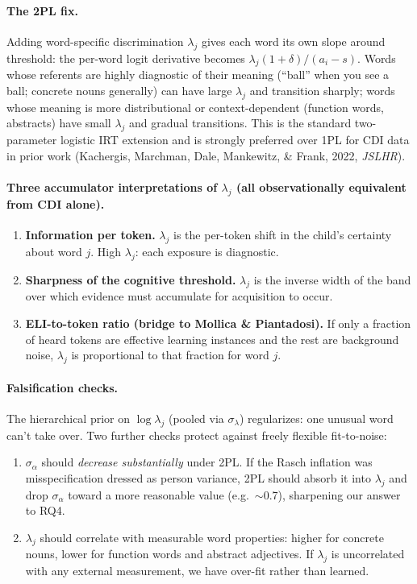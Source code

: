 \documentclass[11pt]{article}
\begin{document}
\paragraph{The 2PL fix.} Adding word-specific discrimination
\(\lambda_j\) gives each word its own slope around threshold: the
per-word logit derivative becomes \(\lambda_j(1+\delta)/(a_i - s)\).
Words whose referents are highly diagnostic of their meaning (``ball''
when you see a ball; concrete nouns generally) can have large
\(\lambda_j\) and transition sharply; words whose meaning is more
distributional or context-dependent (function words, abstracts) have
small \(\lambda_j\) and gradual transitions. This is the standard
two-parameter logistic IRT extension and is strongly preferred over
1PL for CDI data in prior work (Kachergis, Marchman, Dale, Mankewitz,
\& Frank, 2022, \emph{JSLHR}).

\paragraph{Three accumulator interpretations of \(\lambda_j\) (all
observationally equivalent from CDI alone).}
\begin{enumerate}[leftmargin=1.3em]
\item \textbf{Information per token.} \(\lambda_j\) is the per-token
shift in the child's certainty about word \(j\). High \(\lambda_j\):
each exposure is diagnostic.
\item \textbf{Sharpness of the cognitive threshold.} \(\lambda_j\) is
the inverse width of the band over which evidence must accumulate for
acquisition to occur.
\item \textbf{ELI-to-token ratio (bridge to Mollica \& Piantadosi).} If
only a fraction of heard tokens are effective learning instances and the
rest are background noise, \(\lambda_j\) is proportional to that
fraction for word \(j\).
\end{enumerate}

\paragraph{Falsification checks.} The hierarchical prior on
\(\log \lambda_j\) (pooled via \(\sigma_\lambda\)) regularizes: one
unusual word can't take over. Two further checks protect against
freely flexible fit-to-noise:
\begin{enumerate}[leftmargin=1.3em]
\item \(\sigma_\alpha\) should \emph{decrease substantially} under 2PL.
If the Rasch inflation was misspecification dressed as person variance,
2PL should absorb it into \(\lambda_j\) and drop \(\sigma_\alpha\) toward
a more reasonable value (e.g.\ \(\sim\)0.7), sharpening our answer to
RQ4.
\item \(\lambda_j\) should correlate with measurable word properties:
higher for concrete nouns, lower for function words and abstract
adjectives. If \(\lambda_j\) is uncorrelated with any external
measurement, we have over-fit rather than learned.
\end{enumerate}
\end{document}
